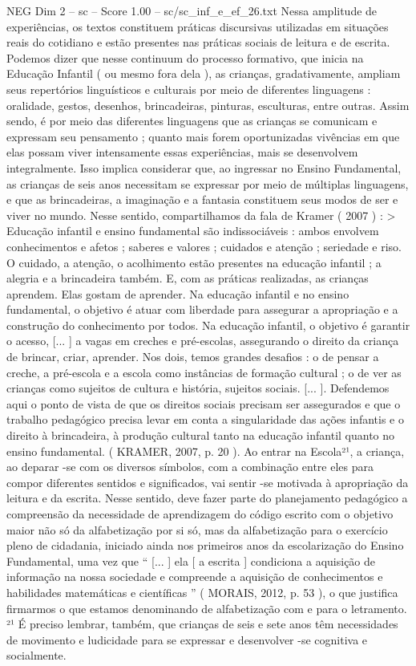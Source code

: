 \begin{textsample}{NEG Dim 2 – sc – Score 1.00 – sc/sc\_inf\_e\_ef\_26.txt}
Nessa amplitude de experiências, os textos constituem práticas discursivas utilizadas em situações reais do cotidiano e estão presentes nas práticas sociais de leitura e de escrita.
Podemos dizer que nesse continuum do processo formativo, que inicia na Educação Infantil ( ou mesmo fora dela ), as crianças, gradativamente, ampliam seus repertórios linguísticos e culturais por meio de diferentes linguagens : oralidade, gestos, desenhos, brincadeiras, pinturas, esculturas, entre outras.
Assim sendo, é por meio das diferentes linguagens que as crianças se comunicam e expressam seu pensamento ; quanto mais forem oportunizadas vivências em que elas possam viver intensamente essas experiências, mais se desenvolvem integralmente.
Isso implica considerar que, ao ingressar no Ensino Fundamental, as crianças de seis anos necessitam se expressar por meio de múltiplas linguagens, e que as brincadeiras, a imaginação e a fantasia constituem seus modos de ser e viver no mundo.
Nesse sentido, compartilhamos da fala de Kramer ( 2007 ) : > Educação infantil e ensino fundamental são indissociáveis : ambos envolvem conhecimentos e afetos ; saberes e valores ; cuidados e atenção ; seriedade e riso.
O cuidado, a atenção, o acolhimento estão presentes na educação infantil ; a alegria e a brincadeira também.
E, com as práticas realizadas, as crianças aprendem.
Elas gostam de aprender.
Na educação infantil e no ensino fundamental, o objetivo é atuar com liberdade para assegurar a apropriação e a construção do conhecimento por todos.
Na educação infantil, o objetivo é garantir o acesso, [... ] a vagas em creches e pré-escolas, assegurando o direito da criança de brincar, criar, aprender.
Nos dois, temos grandes desafios : o de pensar a creche, a pré-escola e a escola como instâncias de formação cultural ; o de ver as crianças como sujeitos de cultura e história, sujeitos sociais. [... ].
Defendemos aqui o ponto de vista de que os direitos sociais precisam ser assegurados e que o trabalho pedagógico precisa levar em conta a singularidade das ações infantis e o direito à brincadeira, à produção cultural tanto na educação infantil quanto no ensino fundamental. ( KRAMER, 2007, p. 20 ).
Ao entrar na Escola²¹, a criança, ao deparar -se com os diversos símbolos, com a combinação entre eles para compor diferentes sentidos e significados, vai sentir -se motivada à apropriação da leitura e da escrita.
Nesse sentido, deve fazer parte do planejamento pedagógico a compreensão da necessidade de aprendizagem do código escrito com o objetivo maior não só da alfabetização por si só, mas da alfabetização para o exercício pleno de cidadania, iniciado ainda nos primeiros anos da escolarização do Ensino Fundamental, uma vez que “ [... ] ela [ a escrita ] condiciona a aquisição de informação na nossa sociedade e compreende a aquisição de conhecimentos e habilidades matemáticas e científicas ” ( MORAIS, 2012, p. 53 ), o que justifica firmarmos o que estamos denominando de alfabetização com e para o letramento. ²¹ É preciso lembrar, também, que crianças de seis e sete anos têm necessidades de movimento e ludicidade para se expressar e desenvolver -se cognitiva e socialmente.

\end{textsample}
